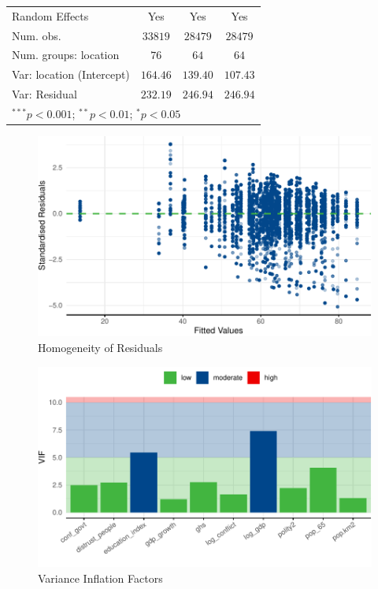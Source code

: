 \documentclass[
  11pt,
]{article}
\begin{document}
\begin{table}
\begin{center}
\begin{tabular}{l c c c}
\hline
Random Effects               & Yes        & Yes        & Yes          \\
Num. obs.                    & $33819$    & $28479$    & $28479$      \\
Num. groups: location        & $76$       & $64$       & $64$         \\
Var: location (Intercept)    & $164.46$   & $139.40$   & $107.43$     \\
Var: Residual                & $232.19$   & $246.94$   & $246.94$     \\
\hline
\multicolumn{4}{l}{\scriptsize{$^{***}p<0.001$; $^{**}p<0.01$; $^{*}p<0.05$}}
\end{tabular}
\label{tab:obs-test}
\end{center}
\end{table}

\begin{figure}
\includegraphics[width=0.8\linewidth]{write_up_test_files/figure-latex/homo-1} \caption{Homogeneity of Residuals}\label{fig:homo}
\end{figure}

\begin{figure}
\includegraphics[width=0.8\linewidth]{write_up_test_files/figure-latex/vif-1} \caption{Variance Inflation Factors}\label{fig:vif}
\end{figure}
\end{document}
